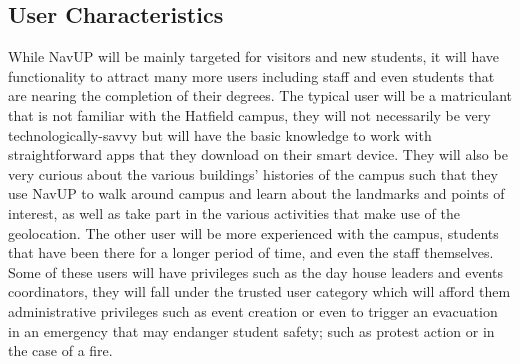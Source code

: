\documentclass[12pt,a4paper]{article}
\begin{document}
	\subsection{User Characteristics}
		While NavUP will be mainly targeted for visitors and new students, it will have functionality to attract many more users including staff and even students that are nearing the completion of their degrees. The typical user will be a matriculant that is not familiar with the Hatfield campus, they will not necessarily be very technologically-savvy but will have the basic knowledge to work with straightforward apps that they download on their smart device. They will also be very curious about the various buildings’ histories of the campus such that they use NavUP to walk around campus and learn about the landmarks and points of interest, as well as take part in the various activities that make use of the geolocation. The other user will be more experienced with the campus, students that have been there for a longer period of time, and even the staff themselves. Some of these users will have privileges such as the day house leaders and events coordinators, they will fall under the trusted user category which will afford them administrative privileges such as event creation or even to trigger an evacuation in an emergency that may endanger student safety; such as protest action or in the case of a fire.
\end{document}
